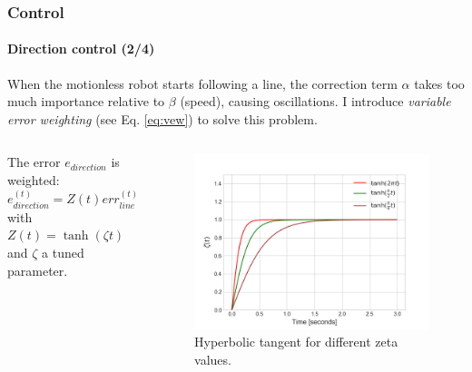 \documentclass[10pt]{beamer}
\begin{document}
\begin{frame}
\frametitle{Control}
\framesubtitle{Direction control (2/4)}
When the motionless robot starts following a line, the correction term $\alpha$ takes too much importance relative to $\beta$ (speed), causing oscillations. I introduce \textit{variable error weighting} (see Eq. \ref{eq:vew}) to solve this problem. 
\vspace*{-3mm}
\begin{columns}[c]

The error $e_{direction}$ is weighted:
\begin{equation}
\label{eq:vew}
e_{direction}^{(t)} = Z(t)err_{line}^{(t)}
\end{equation}
with $Z(t) = \tanh(\zeta t)$ and $\zeta$ a tuned parameter.

\vspace*{-6mm}
\begin{figure}[hbtp]
\centering
\includegraphics[scale=0.4]{figures/zeta.png}
\vspace*{-2mm}
\caption{Hyperbolic tangent for different zeta values.}
\label{fig:zeta}
\end{figure}
\end{columns}
\end{frame}

\end{document}
